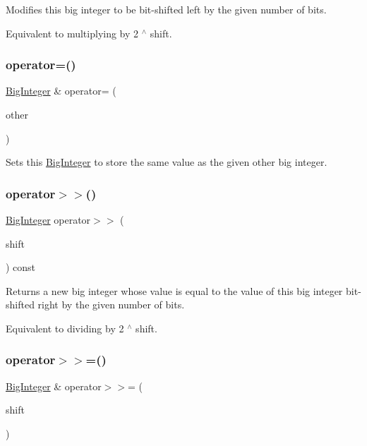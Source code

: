 Modifies this big integer to be bit-\/shifted left by the given number of bits. 

Equivalent to multiplying by 2 $^\wedge$ shift. \mbox{\label{classBigInteger_ac2c411cecad98a599e38ad10f1e27e45}} 
\subsubsection{\texorpdfstring{operator=()}{operator=()}}
{\footnotesize\ttfamily \mbox{\hyperlink{classBigInteger}{Big\+Integer}} \& operator= (\begin{DoxyParamCaption}\item[{const \mbox{\hyperlink{classBigInteger}{Big\+Integer}} \&}]{other }\end{DoxyParamCaption})}



Sets this \mbox{\hyperlink{classBigInteger}{Big\+Integer}} to store the same value as the given other big integer. 

\mbox{\label{classBigInteger_ae57cca21f624d67485bc6b516980d93e}} 
\subsubsection{\texorpdfstring{operator$>$$>$()}{operator>>()}}
{\footnotesize\ttfamily \mbox{\hyperlink{classBigInteger}{Big\+Integer}} operator$>$$>$ (\begin{DoxyParamCaption}\item[{unsigned int}]{shift }\end{DoxyParamCaption}) const}



Returns a new big integer whose value is equal to the value of this big integer bit-\/shifted right by the given number of bits. 

Equivalent to dividing by 2 $^\wedge$ shift. \mbox{\label{classBigInteger_a17190065589ad02d573bbaa3dcb82d2d}} 
\subsubsection{\texorpdfstring{operator$>$$>$=()}{operator>>=()}}
{\footnotesize\ttfamily \mbox{\hyperlink{classBigInteger}{Big\+Integer}} \& operator$>$$>$= (\begin{DoxyParamCaption}\item[{unsigned int}]{shift }\end{DoxyParamCaption})}



